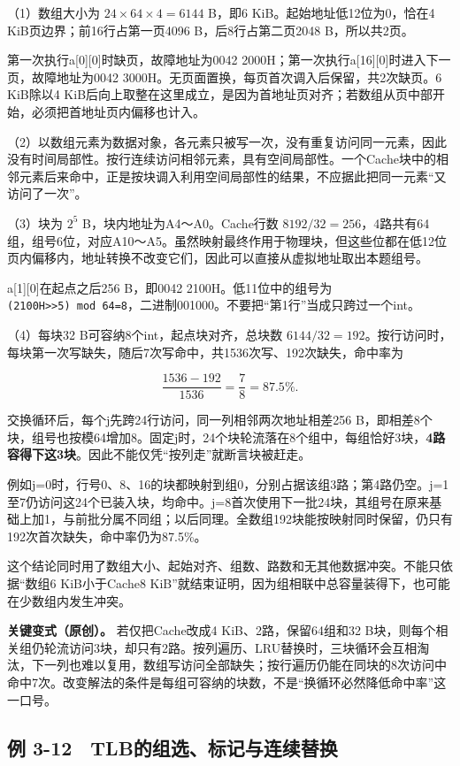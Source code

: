 （1）数组大小为 \(24\times64\times4=6144\) B，即6 KiB。起始地址低12位为0，恰在4 KiB页边界；前16行占第一页4096 B，后8行占第二页2048 B，所以共2页。

第一次执行a{[}0{]}{[}0{]}时缺页，故障地址为0042 2000H；第一次执行a{[}16{]}{[}0{]}时进入下一页，故障地址为0042 3000H。无页面置换，每页首次调入后保留，共2次缺页。6 KiB除以4 KiB后向上取整在这里成立，是因为首地址页对齐；若数组从页中部开始，必须把首地址页内偏移也计入。

（2）以数组元素为数据对象，各元素只被写一次，没有重复访问同一元素，因此没有时间局部性。按行连续访问相邻元素，具有空间局部性。一个Cache块中的相邻元素后来命中，正是按块调入利用空间局部性的结果，不应据此把同一元素``又访问了一次''。

（3）块为 \(2^5\) B，块内地址为A4～A0。Cache行数 \(8192/32=256\)，4路共有64组，组号6位，对应A10～A5。虽然映射最终作用于物理块，但这些位都在低12位页内偏移内，地址转换不改变它们，因此可以直接从虚拟地址取出本题组号。

a{[}1{]}{[}0{]}在起点之后256 B，即0042 2100H。低11位中的组号为 \texttt{(2100H\textgreater{}\textgreater{}5)\ mod\ 64=8}，二进制001000。不要把``第1行''当成只跨过一个int。

（4）每块32 B可容纳8个int，起点块对齐，总块数 \(6144/32=192\)。按行访问时，每块第一次写缺失，随后7次写命中，共1536次写、192次缺失，命中率为

\[
\frac{1536-192}{1536}=\frac78=87.5\%.
\]

交换循环后，每个j先跨24行访问，同一列相邻两次地址相差256 B，即相差8个块，组号也按模64增加8。固定j时，24个块轮流落在8个组中，每组恰好3块，\textbf{4路容得下这3块}。因此不能仅凭``按列走''就断言块被赶走。

例如j=0时，行号0、8、16的块都映射到组0，分别占据该组3路；第4路仍空。j=1至7仍访问这24个已装入块，均命中。j=8首次使用下一批24块，其组号在原来基础上加1，与前批分属不同组；以后同理。全数组192块能按映射同时保留，仍只有192次首次缺失，命中率仍为87.5\%。

这个结论同时用了数组大小、起始对齐、组数、路数和无其他数据冲突。不能只依据``数组6 KiB小于Cache8 KiB''就结束证明，因为组相联中总容量装得下，也可能在少数组内发生冲突。

\textbf{关键变式（原创）。} 若仅把Cache改成4 KiB、2路，保留64组和32 B块，则每个相关组仍轮流访问3块，却只有2路。按列遍历、LRU替换时，三块循环会互相淘汰，下一列也难以复用，数组写访问全部缺失；按行遍历仍能在同块的8次访问中命中7次。改变解法的条件是每组可容纳的块数，不是``换循环必然降低命中率''这一口号。

\subsection{例 3-12　TLB的组选、标记与连续替换}\label{co-ex3-12}

